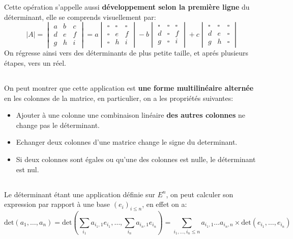 Cette opération s'appelle aussi \textbf{développement selon la première ligne} du déterminant, elle se comprends visuellement par:
\[
   |A| = \begin{vmatrix} a & b & c \\ d & e & f \\ g & h & i \end{vmatrix} = 
   a \begin{vmatrix} \square & \square & \square \\ \square & e & f \\ \square & h & i \end{vmatrix} - 
   b \begin{vmatrix} \square & \square & \square \\ d & \square & f \\ g & \square & i \end{vmatrix} + 
   c \begin{vmatrix} \square & \square & \square \\ d & e & \square \\ g & h & \square \end{vmatrix}   
\]
On régresse ainsi vers des déterminants de plus petite taille, et aprés plusieurs étapes, vers un réel.
\subsection*{}
On peut montrer que cette application est \textbf{une forme multilinéaire alternée} en les colonnes de la matrice, en particulier, on a les propriétés suivantes:
\begin{itemize}
   \item Ajouter à une colonne une combinaison linéaire \textbf{des autres colonnes} ne change pas le déterminant.
   \item Echanger deux colonnes d'une matrice change le signe du determinant.
   \item Si deux colonnes sont égales ou qu'une des colonnes est nulle, le déterminant est nul.
\end{itemize}
\subsection*{}
Le déterminant étant une application définie sur \( E^n \), on peut calculer son expression par rapport à une base \( (e_i)_{ i \leq n} \), en effet on a:
\[ 
   \text{det}(a_1, \ldots, a_n) = \text{det}\left( \sum_{i_1} a_{i_1, 1}e_{i_1}, \ldots, \sum_{i_n} a_{i_n, 1}e_{i_n} \right) = \sum_{i_1, \ldots, i_n \leq n}  a_{i_1, 1} \ldots a_{i_n, n} \times \text{det}(e_{i_1}, \ldots, e_{i_n})
\]

